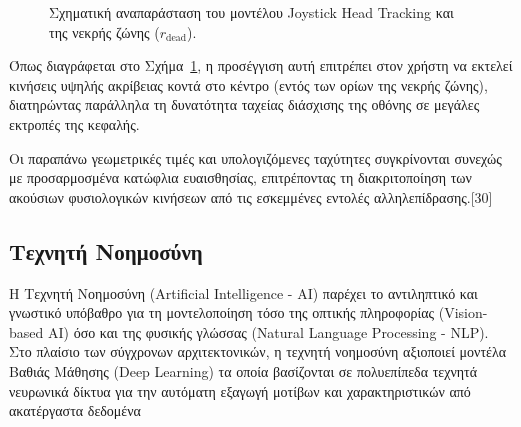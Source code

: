 \documentclass[twoside, a4paper, 11pt]{article}
\newcommand{\textlatin}[1]{\textenglish{#1}}
\begin{document}
\begin{figure}[H]
\centering
{}
\caption{Σχηματική αναπαράσταση του μοντέλου Joystick Head Tracking και της νεκρής ζώνης ($r_{\text{dead}}$).}
\label{fig:joystick_deadzone}
\end{figure}

Όπως διαγράφεται στο Σχήμα~\ref{fig:joystick_deadzone}, η προσέγγιση αυτή επιτρέπει στον χρήστη να εκτελεί κινήσεις υψηλής ακρίβειας κοντά στο κέντρο (εντός των ορίων της νεκρής ζώνης), διατηρώντας παράλληλα τη δυνατότητα ταχείας διάσχισης της οθόνης σε μεγάλες εκτροπές της κεφαλής.

Οι παραπάνω γεωμετρικές τιμές και υπολογιζόμενες ταχύτητες συγκρίνονται συνεχώς με προσαρμοσμένα κατώφλια ευαισθησίας, επιτρέποντας τη διακριτοποίηση των ακούσιων φυσιολογικών κινήσεων από τις εσκεμμένες εντολές αλληλεπίδρασης.[30]
\subsection{Τεχνητή Νοημοσύνη}
Η Τεχνητή Νοημοσύνη (\textlatin{Artificial Intelligence - AI}) παρέχει το αντιληπτικό και γνωστικό υπόβαθρο 
για τη μοντελοποίηση τόσο της οπτικής πληροφορίας (\textlatin{Vision-based AI}) όσο και της φυσικής γλώσσας
(\textlatin{Natural Language Processing - NLP}). 
Στο πλαίσιο των σύγχρονων αρχιτεκτονικών, η τεχνητή νοημοσύνη αξιοποιεί μοντέλα Βαθιάς Μάθησης (\textlatin{Deep Learning}) τα οποία
βασίζονται σε πολυεπίπεδα τεχνητά νευρωνικά δίκτυα για την αυτόματη εξαγωγή μοτίβων και χαρακτηριστικών από ακατέργαστα δεδομένα 
\end{document}
